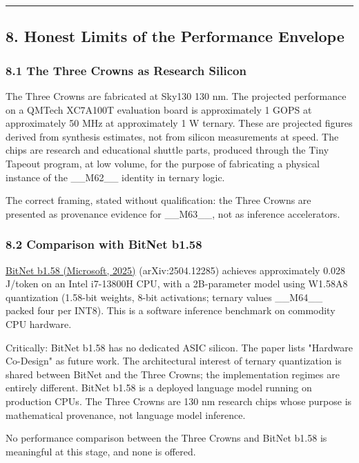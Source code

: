 \noindent\rule{\textwidth}{0.4pt}

\subsection{8. Honest Limits of the Performance Envelope}

\subsubsection{8.1 The Three Crowns as Research Silicon}

The Three Crowns are fabricated at Sky130 130 nm. The projected performance on a QMTech XC7A100T evaluation board is approximately 1 GOPS at approximately 50 MHz at approximately 1 W ternary. These are projected figures derived from synthesis estimates, not from silicon measurements at speed. The chips are research and educational shuttle parts, produced through the Tiny Tapeout program, at low volume, for the purpose of fabricating a physical instance of the \_\_M62\_\_ identity in ternary logic.

The correct framing, stated without qualification: the Three Crowns are presented as provenance evidence for \_\_M63\_\_, not as inference accelerators.

\subsubsection{8.2 Comparison with BitNet b1.58}

\href{https://arxiv.org/abs/2504.12285}{BitNet b1.58 (Microsoft, 2025)} (arXiv:2504.12285) achieves approximately 0.028 J/token on an Intel i7-13800H CPU, with a 2B-parameter model using W1.58A8 quantization (1.58-bit weights, 8-bit activations; ternary values \_\_M64\_\_ packed four per INT8). This is a software inference benchmark on commodity CPU hardware.

Critically: BitNet b1.58 has no dedicated ASIC silicon. The paper lists "Hardware Co-Design" as future work. The architectural interest of ternary quantization is shared between BitNet and the Three Crowns; the implementation regimes are entirely different. BitNet b1.58 is a deployed language model running on production CPUs. The Three Crowns are 130 nm research chips whose purpose is mathematical provenance, not language model inference.

No performance comparison between the Three Crowns and BitNet b1.58 is meaningful at this stage, and none is offered.


